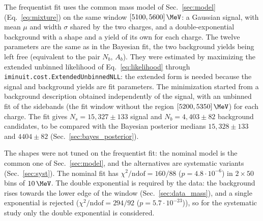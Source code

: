 The frequentist fit uses the common mass model of Sec.~\ref{sec:model} (Eq.~\eqref{eq:mixture}) on the same window $[5100,5600]\,\MeV$: a Gaussian signal, with mean $\mu$ and width $\sigma$ shared by the two charges, and a double-exponential background with a shape and a yield of its own for each charge. The twelve parameters are the same as in the Bayesian fit, the two background yields being left free (equivalent to the pair $N_b$, $A_b$). They were estimated by maximizing the extended unbinned likelihood of Eq.~\eqref{eq:likelihood} through \texttt{iminuit.cost.ExtendedUnbinnedNLL}: the extended form is needed because the signal and background yields are fit parameters. The minimization started from a background description obtained independently of the signal, with an unbinned fit of the sidebands (the fit window without the region $[5200,5350]\,\MeV$) for each charge. The fit gives $N_s=15{,}327\pm133$ signal and $N_b=4{,}403\pm82$ background candidates, to be compared with the Bayesian posterior medians $15{,}328\pm133$ and $4404\pm82$ (Sec.~\ref{sec:bayes_posterior}).

The shapes were not tuned on the frequentist fit: the nominal model is the common one of Sec.~\ref{sec:model}, and the alternatives are systematic variants (Sec.~\ref{sec:syst}). The nominal fit has $\chi^2/\mathrm{ndof}=160/88$ ($p=4.8\cdot 10^{-6}$) in $2\times50$ bins of $10\,\MeV$.
The double exponential is required by the data: the background rises towards the lower edge of the window (Sec.~\ref{sec:data_mass}), and a single exponential is rejected ($\chi^2/\mathrm{ndof}=294/92$ ($p=5.7\cdot 10^{-23}$)), so for the systematic study only the double exponential is considered.

